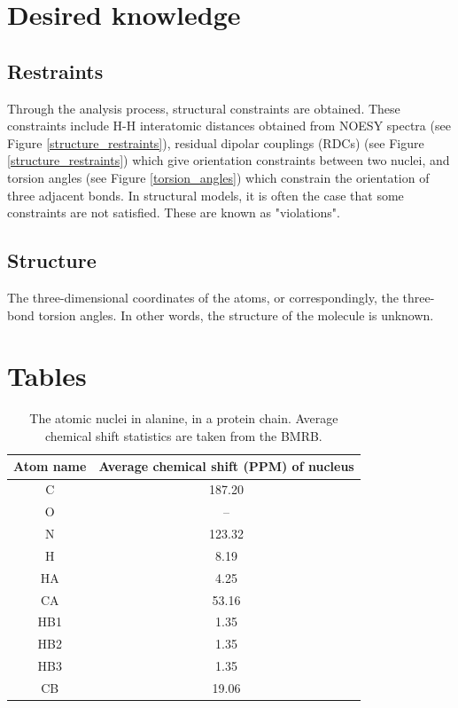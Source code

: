 \section{Desired knowledge}

\subsection*{Restraints}
Through the analysis process, structural constraints are obtained.  These 
constraints include H-H interatomic distances obtained from NOESY spectra
(see Figure \ref{structure_restraints}), residual dipolar couplings (RDCs) 
(see Figure \ref{structure_restraints}) which give orientation constraints
between two nuclei, and torsion angles 
(see Figure \ref{torsion_angles}) which constrain the orientation of three
adjacent bonds.
In structural models, it is often the case that some constraints are not 
satisfied.  These are known as "violations".

\subsection*{Structure} 
The three-dimensional coordinates of the atoms, or correspondingly, the
three-bond torsion angles.  In other words, the structure of the molecule
is unknown.



\clearpage
\section{Tables}

\begin{table}[h]
  \begin{tabular}{ | c | c | }
    \hline
    Atom name   &  Average chemical shift (PPM) of nucleus \\  \hline
    C           &  187.20     \\  \hline
    O           &  --         \\  \hline
    N           &  123.32     \\  \hline
    H           &  8.19       \\  \hline
    HA          &  4.25       \\  \hline
    CA          &  53.16      \\  \hline
    HB1         &  1.35       \\  \hline
    HB2         &  1.35       \\  \hline    
    HB3         &  1.35       \\  \hline
    CB          &  19.06      \\  \hline
  \end{tabular}
  \caption[The atomic nuclei in alanine, in a protein chain.]
          {The atomic nuclei in alanine, in a protein chain.
           Average chemical shift statistics are taken from the BMRB.}
  \label{alanine_atoms}
\end{table}

